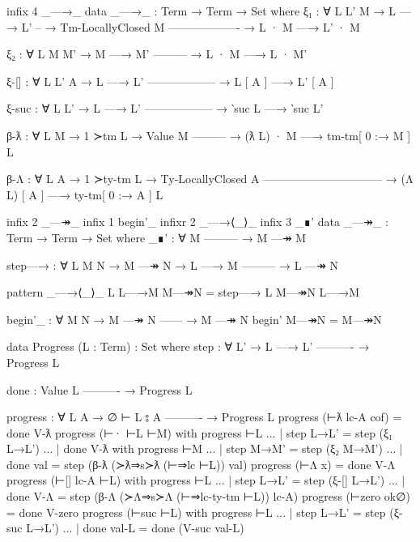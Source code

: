 \documentclass[logo,bsc,singlespacing,parskip,online]{infthesis}
\renewenvironment{code}{\mintedcopy[breaklines,breaksymbolleft=\;]{agda}}{\endmintedcopy}
\begin{document}
\begin{code}
  infix 4 _—→_
  data _—→_ : Term → Term → Set where
    ξ₁ : ∀ {L L' M}
      → L —→ L'
      -- → Tm-LocallyClosed M
        -------------------
      → L · M —→ L' · M

    ξ₂ : ∀ {L M M'}
      → M —→ M'
        ---------
      → L · M —→ L · M'

    ξ-[] : ∀ {L L' A}
      → L —→ L'
        ------------------
      → L [ A ] —→ L' [ A ]

    ξ-suc : ∀ {L L'}
      → L —→ L'
        ------------------
      → ‵suc L —→ ‵suc L'

    β-ƛ : ∀ {L M}
      → 1 ≻tm L
      → Value M
        ---------
      → (ƛ L) · M —→ tm-tm[ 0 :→ M ] L

    β-Λ : ∀ {L A}
      → 1 ≻ty-tm L
      → Ty-LocallyClosed A
        --------------------------------
      → (Λ L) [ A ] —→ ty-tm[ 0 :→ A ] L
\end{code}

\begin{code}
  infix  2 _—↠_
  infix  1 begin'_
  infixr 2 _—→⟨_⟩_
  infix  3 _∎'
  data _—↠_ : Term → Term → Set where
    _∎' : ∀ M
        ---------
      → M —↠ M

    step—→ : ∀ L {M N}
      → M —↠ N
      → L —→ M
        ---------
      → L —↠ N

  pattern _—→⟨_⟩_ L L—→M M—↠N = step—→ L M—↠N L—→M

  begin'_ : ∀ {M N}
    → M —↠ N
      ------
    → M —↠ N
  begin' M—↠N = M—↠N
\end{code}

\begin{code}
  data Progress (L : Term) : Set where
    step : ∀ {L'}
      → L —→ L'
        ----------
      → Progress L

    done :
        Value L
        ----------
      → Progress L

  progress : ∀ {L A}
    → ∅ ⊢ L ⦂ A
      ----------
    → Progress L
  progress (⊢ƛ lc-A cof) = done V-ƛ
  progress (⊢· ⊢L ⊢M) with progress ⊢L
  ... | step L→L' = step (ξ₁ L→L')
  ... | done V-ƛ with progress ⊢M
  ...   | step M→M' = step (ξ₂ M→M')
  ...   | done val  = step (β-ƛ (≻ƛ⇒s≻ƛ (⊢⇒lc ⊢L)) val)
  progress (⊢Λ x) = done V-Λ
  progress (⊢[] lc-A ⊢L) with progress ⊢L
  ... | step L→L' = step (ξ-[] L→L')
  ... | done V-Λ = step (β-Λ (≻Λ⇒s≻Λ (⊢⇒lc-ty-tm ⊢L)) lc-A)
  progress (⊢zero ok∅) = done V-zero
  progress (⊢suc ⊢L) with progress ⊢L
  ... | step L→L'  = step (ξ-suc L→L')
  ... | done val-L = done (V-suc val-L)
\end{code}
\end{document}
